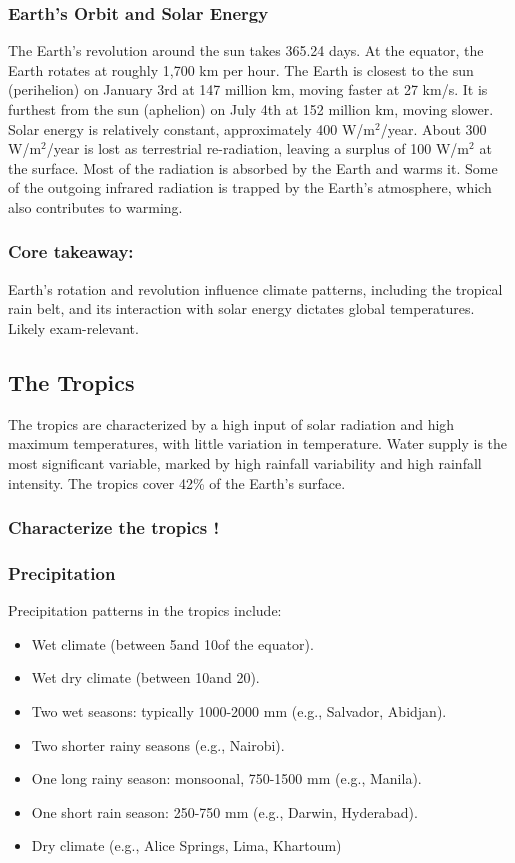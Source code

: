 \subsubsection{Earth's Orbit and Solar Energy} The Earth's revolution around the sun takes 365.24 days. At the equator, the Earth rotates at roughly 1,700 km per hour. The Earth is closest to the sun (perihelion) on January 3rd at 147 million km, moving faster at 27 km/s. It is furthest from the sun (aphelion) on July 4th at 152 million km, moving slower. Solar energy is relatively constant, approximately 400 W/m$^2$/year. About 300 W/m$^2$/year is lost as terrestrial re-radiation, leaving a surplus of 100 W/m$^2$ at the surface. Most of the radiation is absorbed by the Earth and warms it. Some of the outgoing infrared radiation is trapped by the Earth’s atmosphere, which also contributes to warming.

\subsubsection*{Core takeaway: }
Earth's rotation and revolution influence climate patterns, including the tropical rain belt, and its interaction with solar energy dictates global temperatures. Likely exam-relevant. 


\subsection{The Tropics} 
The tropics are characterized by a high input of solar radiation and high maximum temperatures, with little variation in temperature. Water supply is the most significant variable, marked by high rainfall variability and high rainfall intensity. The tropics cover 42\% of the Earth's surface. 
\subsubsection{Characterize the tropics !} 
\subsubsection{Precipitation} 
Precipitation patterns in the tropics include: 
\begin{itemize} 
    \item Wet climate (between 5\textdegree and 10\textdegree of the equator). 
    \item Wet dry climate (between 10\textdegree and 20\textdegree). 
    \item Two wet seasons: typically 1000-2000 mm (e.g., Salvador, Abidjan). 
    \item Two shorter rainy seasons (e.g., Nairobi). 
    \item One long rainy season: monsoonal, 750-1500 mm (e.g., Manila). 
    \item One short rain season: 250-750 mm (e.g., Darwin, Hyderabad). 
    \item Dry climate (e.g., Alice Springs, Lima, Khartoum)
\end{itemize}


